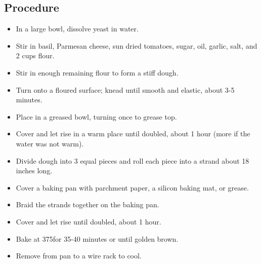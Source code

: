 \documentclass[10pt, openany]{book}
\begin{document}
\subsection{Procedure}
\begin{itemize}
  \item In a large bowl, dissolve yeast in water.
  \item Stir in basil, Parmesan cheese, sun dried tomatoes, sugar, oil, garlic, salt, and 2 cups flour.
  \item Stir in enough remaining flour to form a stiff dough.
  \item Turn onto a floured surface; knead until smooth and elastic, about 3-5 minutes.
  \item Place in a greased bowl, turning once to grease top.
  \item Cover and let rise in a warm place until doubled, about 1 hour (more if the water was not warm).
  \item Divide dough into 3 equal pieces and roll each piece into a strand about 18 inches long.
  \item Cover a baking pan with parchment paper, a silicon baking mat, or grease.
  \item Braid the strands together on the baking pan.
  \item Cover and let rise until doubled, about 1 hour.
  \item Bake at 375\degree for 35-40 minutes or until golden brown.
  \item Remove from pan to a wire rack to cool.
\end{itemize}
\end{document}
